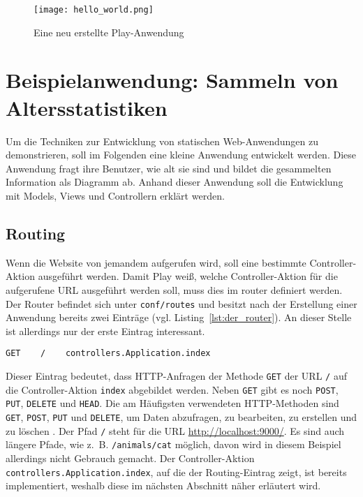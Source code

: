 \begin{figure}[h]
\centering
\texttt{[image: hello\_world.png]}
\caption{Eine neu erstellte Play-Anwendung}
\label{fig:anwendung_nach_erstellung}
\end{figure}



\section{Beispielanwendung: Sammeln von Altersstatistiken} %
\label{sec:beispielanwendung}

Um die Techniken zur Entwicklung von statischen Web-Anwendungen zu demonstrieren, soll im Folgenden eine kleine Anwendung entwickelt werden.
Diese Anwendung fragt ihre Benutzer, wie alt sie sind und bildet die gesammelten Information als Diagramm ab.
Anhand dieser Anwendung soll die Entwicklung mit Models, Views und Controllern erklärt werden.


\subsection{Routing} %
\label{sub:routing}

Wenn die Website von jemandem aufgerufen wird, soll eine bestimmte Controller-Aktion ausgeführt werden.
Damit Play weiß, welche Controller-Aktion für die aufgerufene URL ausgeführt werden soll, muss dies im \gls{router} definiert werden.
Der Router befindet sich unter \lstinline|conf/routes| und besitzt nach der Erstellung einer Anwendung bereits zwei Einträge (vgl. Listing~\ref{lst:der_router}).
An dieser Stelle ist allerdings nur der erste Eintrag interessant.

\begin{lstlisting}[caption=Der Router, label=lst:der_router]
  GET    /    controllers.Application.index
\end{lstlisting}

Dieser Eintrag bedeutet, dass HTTP-Anfragen der Methode \lstinline|GET| der URL \lstinline|/| auf die Controller-Aktion \lstinline|index| abgebildet werden.
Neben \lstinline|GET| gibt es noch \lstinline|POST|, \lstinline|PUT|, \lstinline|DELETE| und \lstinline|HEAD|.
Die am Häufigsten verwendeten HTTP-Methoden sind \lstinline|GET|, \lstinline|POST|, \lstinline|PUT| und \lstinline|DELETE|, um Daten abzufragen, zu bearbeiten, zu erstellen und zu löschen \cite[vgl.][S.~6]{play_for_scala_v8}.
Der Pfad \lstinline|/| steht für die URL \url{http://localhost:9000/}.
Es sind auch längere Pfade, wie z.~B. \lstinline|/animals/cat| möglich, davon wird in diesem Beispiel allerdings nicht Gebrauch gemacht.
Der Controller-Aktion \lstinline|controllers.Application.index|, auf die der Routing-Eintrag zeigt, ist bereits implementiert, weshalb diese im nächsten Abschnitt näher erläutert wird.

